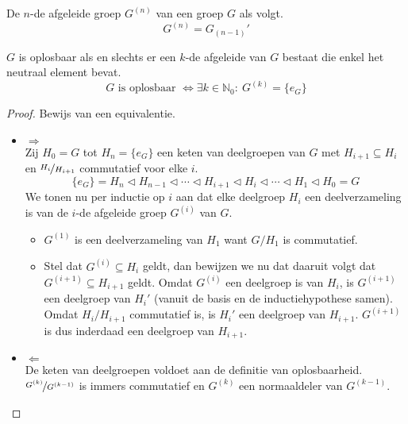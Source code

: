 \documentclass[main.tex]{subfiles}
\begin{document}
\begin{de}
  De $n$-de afgeleide groep $G^{(n)}$ van een groep $G$ als volgt.
  \[ G^{(n)} = G_{(n-1)}' \]
\end{de}

\begin{pr}
  $G$ is oplosbaar als en slechts er een $k$-de afgeleide van $G$ bestaat die enkel het neutraal element bevat.
  \[ G \text{ is oplosbaar } \Leftrightarrow \exists k\in\mathbb{N}_{0}:\ G^{(k)} = \{e_{G}\} \]

  \begin{proof}
    Bewijs van een equivalentie.
    \begin{itemize}
    \item $\Rightarrow$\\
       Zij $H_{0}=G$ tot $H_{n} = \{e_{G}\}$ een keten van deelgroepen van $G$ met $H_{i+1} \subseteq H_{i}$ en $\nicefrac{H_{i}}{H_{i+1}}$ commutatief voor elke $i$.
       \[ \{ e_{G} \} = H_{n} \triangleleft H_{n-1} \triangleleft \dotsb \triangleleft H_{i+1} \triangleleft H_{i} \triangleleft \dotsb \triangleleft H_{1} \triangleleft H_{0} = G \]
       We tonen nu per inductie op $i$ aan dat elke deelgroep $H_{i}$ een deelverzameling is van de $i$-de afgeleide groep $G^{(i)}$ van $G$.
       \begin{itemize}
       \item $G^{(1)}$ is een deelverzameling van $H_{1}$ want $G/H_{1}$ is commutatief.
       \item Stel dat $G^{(i)} \subseteq H_{i}$ geldt, dan bewijzen we nu dat daaruit volgt dat $G^{(i+1)} \subseteq H_{i+1}$ geldt.
         Omdat $G^{(i)}$ een deelgroep is van $H_{i}$, is $G^{(i+1)}$ een deelgroep van $H_{i}'$ (vanuit de basis en de inductiehypothese samen).
         Omdat $H_{i}/H_{i+1}$ commutatief is, is $H_{i}'$ een deelgroep van $H_{i+1}$.
         $G^{(i+1)}$ is dus inderdaad een deelgroep van $H_{i+1}$.
       \end{itemize}
    \item $\Leftarrow$\\
      De keten van deelgroepen voldoet aan de definitie van oplosbaarheid.
      $\nicefrac{G^{(k)}}{G^{(k-1)}}$ is immers commutatief en $G^{(k)}$ een normaaldeler van $G^{(k-1)}$.
    \end{itemize}
  \end{proof}
\end{pr}
\end{document}
